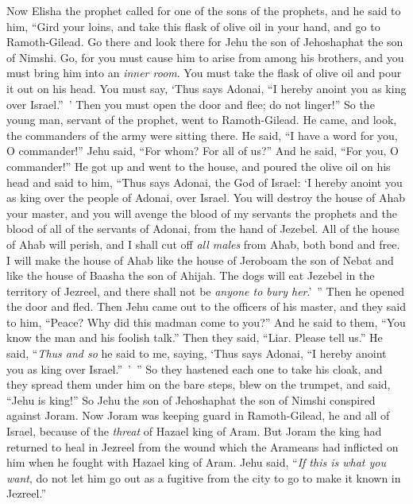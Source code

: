 \begin{biblechapter} %
 Now Elisha the prophet called for one of the sons of the prophets, and he said to him, “Gird your loins, and take this flask of olive oil in your hand, and go to Ramoth-Gilead.
\verse Go there and look there for Jehu the son of Jehoshaphat the son of Nimshi. Go, for you must cause him to arise from among his brothers, and you must bring him into an \textit{inner room}.
\verse You must take the flask of olive oil and pour it out on his head. You must say, ‘Thus says Adonai, “I hereby anoint you as king over Israel.” ’ Then you must open the door and flee; do not linger!”
\verse So the young man, servant of the prophet, went to Ramoth-Gilead.
\verse He came, and look, the commanders of the army were sitting there. He said, “I have a word for you, O commander!” Jehu said, “For whom? For all of us?” And he said, “For you, O commander!”
\verse He got up and went to the house, and poured the olive oil on his head and said to him, “Thus says Adonai, the God of Israel: ‘I hereby anoint you as king over the people of Adonai, over Israel.
\verse You will destroy the house of Ahab your master, and you will avenge the blood of my servants the prophets and the blood of all of the servants of Adonai, from the hand of Jezebel.
\verse All of the house of Ahab will perish, and I shall cut off \textit{all males} from Ahab, both bond and free.
\verse I will make the house of Ahab like the house of Jeroboam the son of Nebat and like the house of Baasha the son of Ahijah.
\verse The dogs will eat Jezebel in the territory of Jezreel, and there shall not be \textit{anyone to bury her}.’ ” Then he opened the door and fled.
 Then Jehu came out to the officers of his master, and they said to him, “Peace? Why did this madman come to you?” And he said to them, “You know the man and his foolish talk.”
\verse Then they said, “Liar. Please tell us.” He said, “\textit{Thus and so} he said to me, saying, ‘Thus says Adonai, “I hereby anoint you as king over Israel.” ’ ”
\verse So they hastened each one to take his cloak, and they spread them under him on the bare steps, blew on the trumpet, and said, “Jehu is king!”
\verse So Jehu the son of Jehoshaphat the son of Nimshi conspired against Joram. Now Joram was keeping guard in Ramoth-Gilead, he and all of Israel, because of the \textit{threat} of Hazael king of Aram.
\verse But Joram the king had returned to heal in Jezreel from the wound which the Arameans had inflicted on him when he fought with Hazael king of Aram. Jehu said, “\textit{If this is what you want}, do not let him go out as a fugitive from the city to go to make it known in Jezreel.”

\end{biblechapter}
